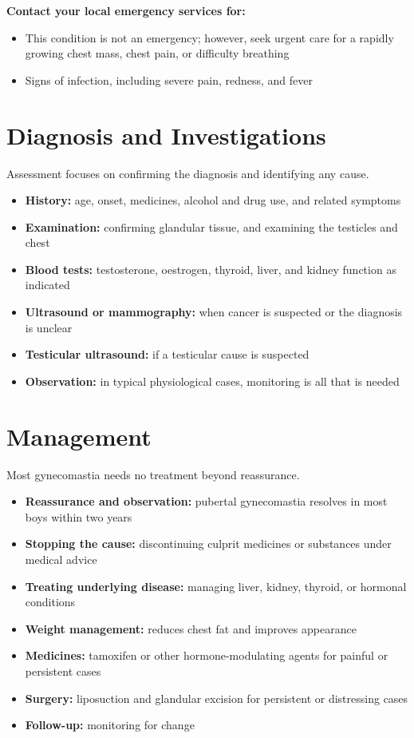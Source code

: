 \textbf{Contact your local emergency services for:}
\begin{itemize}
    \item This condition is not an emergency; however, seek urgent care for a rapidly growing chest mass, chest pain, or difficulty breathing
    \item Signs of infection, including severe pain, redness, and fever
\end{itemize}

\section*{Diagnosis and Investigations}
Assessment focuses on confirming the diagnosis and identifying any cause.

\begin{itemize}
    \item \textbf{History:} age, onset, medicines, alcohol and drug use, and related symptoms
    \item \textbf{Examination:} confirming glandular tissue, and examining the testicles and chest
    \item \textbf{Blood tests:} testosterone, oestrogen, thyroid, liver, and kidney function as indicated
    \item \textbf{Ultrasound or mammography:} when cancer is suspected or the diagnosis is unclear
    \item \textbf{Testicular ultrasound:} if a testicular cause is suspected
    \item \textbf{Observation:} in typical physiological cases, monitoring is all that is needed
\end{itemize}

\section*{Management}
Most gynecomastia needs no treatment beyond reassurance.

\begin{itemize}
    \item \textbf{Reassurance and observation:} pubertal gynecomastia resolves in most boys within two years
    \item \textbf{Stopping the cause:} discontinuing culprit medicines or substances under medical advice
    \item \textbf{Treating underlying disease:} managing liver, kidney, thyroid, or hormonal conditions
    \item \textbf{Weight management:} reduces chest fat and improves appearance
    \item \textbf{Medicines:} tamoxifen or other hormone-modulating agents for painful or persistent cases
    \item \textbf{Surgery:} liposuction and glandular excision for persistent or distressing cases
    \item \textbf{Follow-up:} monitoring for change
\end{itemize}


